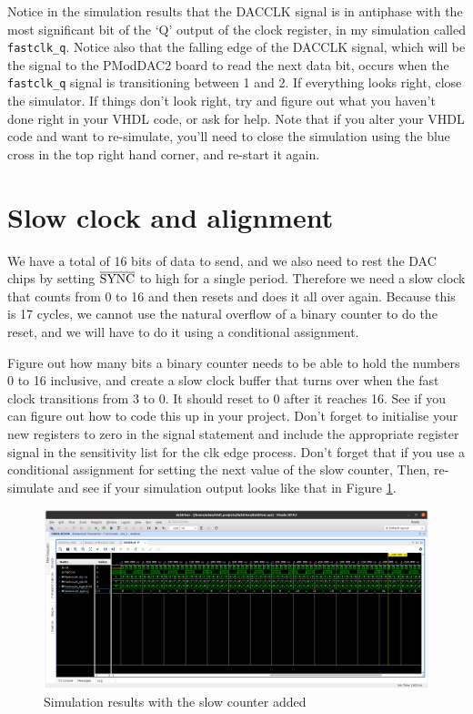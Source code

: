 \documentclass[../physical_computing.tex]{subfiles}
\begin{document}
Notice in the simulation results that the DACCLK signal is in antiphase with the most significant bit of the `Q' output of the clock register, in my simulation called
\texttt{fastclk\_q}. Notice also that the falling edge of the DACCLK signal, which will
be the signal to the PModDAC2 board to read the next data bit, occurs when the 
\texttt{fastclk\_q} signal is transitioning between 1 and 2. If everything looks right, close the simulator. If things don't look right, try and figure out what you haven't done right in
your VHDL code, or ask for help. Note that if you alter your VHDL code and want to re-simulate, you'll need to close the simulation using the blue cross in the top right hand
corner, and re-start it again.

\section{Slow clock and alignment}
\label{sec:slowclk}

We have a total of 16 bits of data to send, and we also need to rest the DAC chips by
setting $\rm \overline{SYNC}$ to high for a single period. Therefore we need a slow
clock that counts from 0 to 16 and then resets and does it all over again. Because
this is 17 cycles, we cannot use the natural overflow of a binary counter to do the 
reset, and we will have to do it using a conditional assignment.

Figure out how many bits a binary counter needs to be able to hold the numbers 0 to
16 inclusive, and create a slow clock buffer that turns over when the fast clock
transitions from 3 to 0. It should reset to 0 after it reaches 16. See if you can 
figure out how to code this up in your project. Don't forget to initialise your new registers to zero in the signal statement and include the appropriate register signal in the sensitivity list for the clk edge process. Don't forget that if you use a conditional assignment for setting the next value of the slow counter, Then, re-simulate and see if your simulation output looks like that in Figure \ref{fig:vivdac5}.

\begin{figure}[htbp]
    \centering
    \includegraphics[width=1.0\textwidth]{appendix_7/figures/vivdac5.png}
    \caption{Simulation results with the slow counter added}
    \label{fig:vivdac5}
\end{figure}
\end{document}
